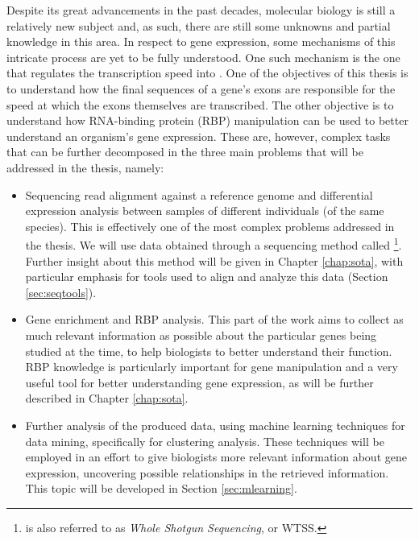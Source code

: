 Despite its great advancements in the past decades, molecular biology is still a
relatively new subject and, as such, there are still some unknowns and partial
knowledge in this area. In respect to gene expression, some mechanisms of this
intricate process are yet to be fully understood. One such mechanism is the one
that regulates the transcription speed into \rna. One of the objectives of this
thesis is to understand how the final sequences of a gene's exons are
responsible for the speed at which the exons themselves are transcribed. The
other objective is to understand how RNA-binding protein (RBP) manipulation can
be used to better understand an organism's gene expression. These are, however,
complex tasks that can be further decomposed in the three main problems that
will be addressed in the thesis, namely:

\begin{itemize}

  \item
  Sequencing read alignment against a reference genome and differential
  expression analysis between samples of different individuals (of the same
  species). This is effectively one of the most complex problems addressed in
  the thesis. We will use data obtained through a sequencing method called
  \rnaseq{}\footnote{\rnaseq{} is also referred to as \textit{Whole \Trans{}
  Shotgun Sequencing}, or WTSS.}. Further insight about this method will be
  given in Chapter \ref{chap:sota}, with particular emphasis for tools used to
  align and analyze this data (Section \ref{sec:seqtools}).

  \item
  Gene enrichment and RBP analysis. This part of the work aims to collect as
  much relevant information as possible about the particular genes being studied
  at the time, to help biologists to better understand their function. RBP
  knowledge is particularly important for gene manipulation and a very useful
  tool for better understanding gene expression, as will be further described in
  Chapter \ref{chap:sota}.

  \item
  Further analysis of the produced data, using machine learning techniques for
  data mining, specifically for clustering analysis. These techniques will be
  employed in an effort to give biologists more relevant information about gene
  expression, uncovering possible relationships in the retrieved information.
  This topic will be developed in Section \ref{sec:mlearning}.

\end{itemize}

